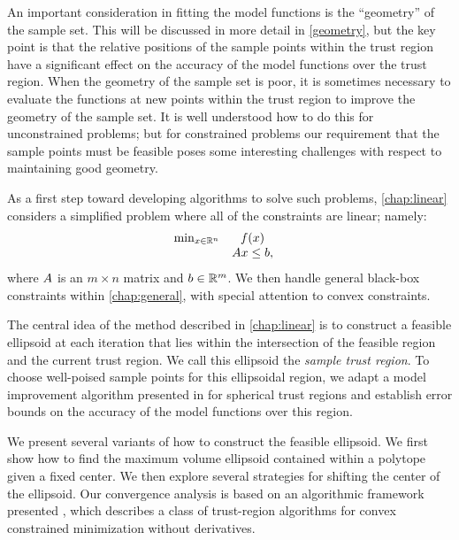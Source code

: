 An important consideration in fitting the model functions is the ``geometry'' of the sample set.
This will be discussed in more detail in \cref{geometry}, but the key point is that the relative positions of the sample points within the trust region have a significant effect on the accuracy of the model functions over the trust region.
When the geometry of the sample set is poor, it is sometimes necessary to evaluate the functions at new points within the trust region to improve the geometry of the sample set.
It is well understood how to do this for unconstrained problems; but for constrained problems
our requirement that the sample points must be feasible  poses some interesting challenges with respect to maintaining good geometry.   

As a first step toward developing algorithms to solve such problems,  \cref{chap:linear}  considers a simplified problem where all of the constraints are linear; namely:
\begin{equation}
\begin{array}{ccl} \min_{x \in \mathbb R^n} & f(x) \\
& {A} x \le {b}, & 
\end{array}
\end{equation}
where ${A}$ is an $m \times n$ matrix and ${b} \in \mathbb R^m$.
We then handle general black-box constraints within \cref{chap:general}, with special attention to convex constraints.


\begin{boxedcomment}

The central idea of the method described in \cref{chap:linear}
is to construct a feasible ellipsoid at each iteration that lies within the intersection of the feasible region and the current trust region.
We call this ellipsoid the {\em sample trust region}.
To choose well-poised sample points for this ellipsoidal region,  we adapt a model improvement algorithm presented in \cite{introduction_book} 
for spherical trust regions and establish error bounds on the accuracy of the model functions over this region.   

We present several variants of how to construct the feasible ellipsoid.
We first show how to find the maximum volume ellipsoid contained within a polytope given a fixed center.
We then explore several strategies for shifting the center of the ellipsoid.    
Our convergence analysis is based on an algorithmic framework presented \cite{Conejo:2013:GCT:2620806.2621814},
which describes a class of trust-region algorithms for convex constrained minimization without derivatives. 
\end{boxedcomment}

